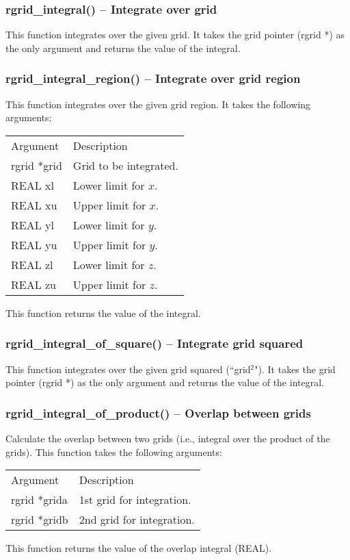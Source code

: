 \documentclass[12pt,letterpaper]{article}
\begin{document}
\subsubsection{rgrid\_integral() -- Integrate over grid}

This function integrates over the given grid. It takes the grid pointer (rgrid *) as the only argument and returns the value of the integral. 

\subsubsection{rgrid\_integral\_region() -- Integrate over grid region}

This function integrates over the given grid region. It takes the following arguments:
\begin{longtable}{p{} p{}}
Argument & Description\\
\cline{1-2}
rgrid *grid & Grid to be integrated.\\
REAL xl & Lower limit for $x$.\\
REAL xu & Upper limit for $x$.\\
REAL yl & Lower limit for $y$.\\
REAL yu & Upper limit for $y$.\\
REAL zl & Lower limit for $z$.\\
REAL zu & Upper limit for $z$.\\
\end{longtable}
\noindent
This function returns the value of the integral. 

\subsubsection{rgrid\_integral\_of\_square() -- Integrate grid squared}

This function integrates over the given grid squared (``grid$^2$"). It takes the grid pointer (rgrid *) as the only argument and returns the value of the integral.

\subsubsection{rgrid\_integral\_of\_product() -- Overlap between grids}

Calculate the overlap between two grids (i.e., integral over the product of the grids). This function takes the following arguments:
\begin{longtable}{p{} p{}}
Argument & Description\\
\cline{1-2}
rgrid *grida & 1st grid for integration.\\
rgrid *gridb & 2nd grid for integration.\\
\end{longtable}
\noindent
This function returns the value of the overlap integral (REAL).
\end{document}
